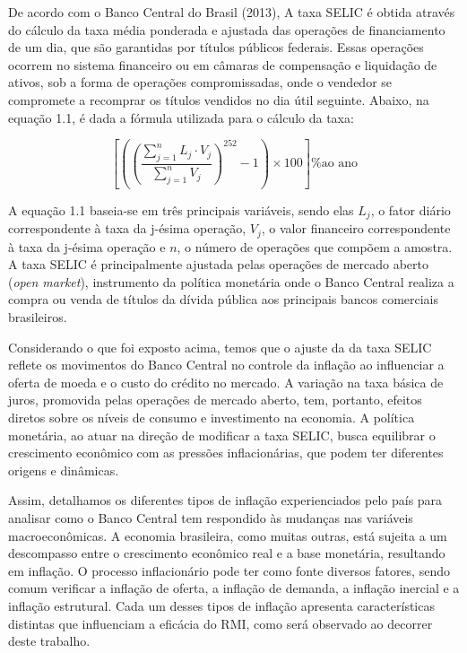 \documentclass[12pt,oneside,a4paper,chapter=TITLE,english,brazil,sumario=abnt-6027-2012]{abntex2}
\begin{document}
De acordo com o Banco Central do Brasil (2013), A taxa SELIC é obtida através do cálculo da taxa média ponderada e ajustada das operações de financiamento de um dia, que são garantidas por títulos públicos federais. Essas operações ocorrem no sistema financeiro ou em câmaras de compensação e liquidação de ativos, sob a forma de operações compromissadas, onde o vendedor se compromete a recomprar os títulos vendidos no dia útil seguinte. Abaixo, na equação 1.1, é dada a fórmula utilizada para o cálculo da taxa:

\begin{equation}
	\left[ \left( \left(\frac{\sum_{j=1}^{n} L_j \cdot V_j}{\sum_{j=1}^{n} V_j} \right)^{252} - 1 \right) \times 100 \right] \textrm{\% ao ano}
\end{equation}


A equação 1.1 baseia-se em três principais variáveis, sendo elas $L_j$, o fator diário correspondente à taxa da j-ésima operação, $V_j$, o valor financeiro correspondente à taxa da j-ésima operação e $n$, o número de operações que compõem a amostra. A taxa SELIC é principalmente ajustada pelas operações de mercado aberto (\textit{open market}), instrumento da política monetária onde o Banco Central realiza a compra ou venda de títulos da dívida pública aos principais bancos comerciais brasileiros.

Considerando o que foi exposto acima, temos que o ajuste da da taxa SELIC reflete os movimentos do Banco Central no controle da inflação ao influenciar a oferta de moeda e o custo do crédito no mercado. A variação na taxa básica de juros, promovida pelas operações de mercado aberto, tem, portanto, efeitos diretos sobre os níveis de consumo e investimento na economia. A política monetária, ao atuar na direção de modificar a taxa SELIC, busca equilibrar o crescimento econômico com as pressões inflacionárias, que podem ter diferentes origens e dinâmicas.

Assim, detalhamos os diferentes tipos de inflação experienciados pelo país para analisar como o Banco Central tem respondido às mudanças nas variáveis macroeconômicas. A economia brasileira, como muitas outras, está sujeita a um descompasso entre o crescimento econômico real e a base monetária, resultando em inflação. O processo inflacionário pode ter como fonte diversos fatores, sendo comum verificar a inflação de oferta, a inflação de demanda, a inflação inercial e a inflação estrutural. Cada um desses tipos de inflação apresenta características distintas que influenciam a eficácia do RMI, como será observado ao decorrer deste trabalho.
\end{document}

